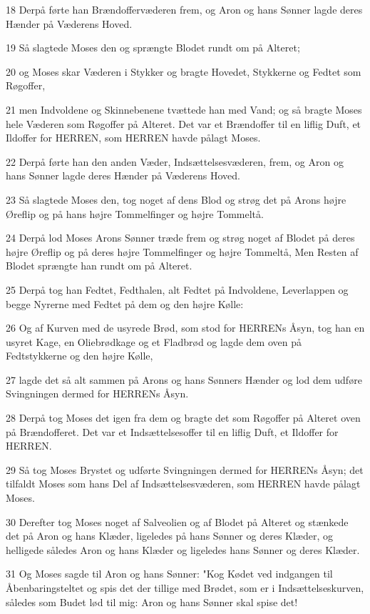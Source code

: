 \par 18 Derpå førte han Brændoffervæderen frem, og Aron og hans Sønner lagde deres Hænder på Væderens Hoved.
\par 19 Så slagtede Moses den og sprængte Blodet rundt om på Alteret;
\par 20 og Moses skar Væderen i Stykker og bragte Hovedet, Stykkerne og Fedtet som Røgoffer,
\par 21 men Indvoldene og Skinnebenene tvættede han med Vand; og så bragte Moses hele Væderen som Røgoffer på Alteret. Det var et Brændoffer til en liflig Duft, et Ildoffer for HERREN, som HERREN havde pålagt Moses.
\par 22 Derpå førte han den anden Væder, Indsættelsesvæderen, frem, og Aron og hans Sønner lagde deres Hænder på Væderens Hoved.
\par 23 Så slagtede Moses den, tog noget af dens Blod og strøg det på Arons højre Øreflip og på hans højre Tommelfinger og højre Tommeltå.
\par 24 Derpå lod Moses Arons Sønner træde frem og strøg noget af Blodet på deres højre Øreflip og på deres højre Tommelfinger og højre Tommeltå, Men Resten af Blodet sprængte han rundt om på Alteret.
\par 25 Derpå tog han Fedtet, Fedthalen, alt Fedtet på Indvoldene, Leverlappen og begge Nyrerne med Fedtet på dem og den højre Kølle:
\par 26 Og af Kurven med de usyrede Brød, som stod for HERRENs Åsyn, tog han en usyret Kage, en Oliebrødkage og et Fladbrød og lagde dem oven på Fedtstykkerne og den højre Kølle,
\par 27 lagde det så alt sammen på Arons og hans Sønners Hænder og lod dem udføre Svingningen dermed for HERRENs Åsyn.
\par 28 Derpå tog Moses det igen fra dem og bragte det som Røgoffer på Alteret oven på Brændofferet. Det var et Indsættelsesoffer til en liflig Duft, et Ildoffer for HERREN.
\par 29 Så tog Moses Brystet og udførte Svingningen dermed for HERRENs Åsyn; det tilfaldt Moses som hans Del af Indsættelsesvæderen, som HERREN havde pålagt Moses.
\par 30 Derefter tog Moses noget af Salveolien og af Blodet på Alteret og stænkede det på Aron og hans Klæder, ligeledes på hans Sønner og deres Klæder, og helligede således Aron og hans Klæder og ligeledes hans Sønner og deres Klæder.
\par 31 Og Moses sagde til Aron og hans Sønner: "Kog Kødet ved indgangen til Åbenbaringsteltet og spis det der tillige med Brødet, som er i Indsættelseskurven, således som Budet lød til mig: Aron og hans Sønner skal spise det!
